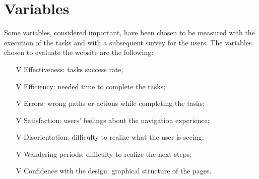 \documentclass[../../UsabilityReport.tex]{subfiles}
\begin{document}
\section{Variables}\label{2.3}
	Some variables, considered important, have been chosen to be measured with the execution of the tasks and with a subsequent survey for the users. The variables chosen to evaluate the website are the following:
	\begin{itemize}
		\item[V\subs{1}] Effectiveness: tasks success rate;
		\item[V\subs{2}] Efficiency: needed time to complete the tasks;
		\item[V\subs{3}] Errors: wrong paths or actions while completing the tasks;
		\item[V\subs{4}] Satisfaction: users' feelings about the navigation experience;
		\item[V\subs{5}] Disorientation: difficulty to realize what the user is seeing;
		\item[V\subs{6}] Wandering periods: difficulty to realize the next steps;
		\item[V\subs{7}] Confidence with the design: graphical structure of the pages.
	\end{itemize}
\end{document}
